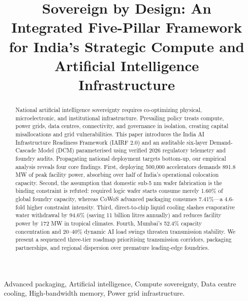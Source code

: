\documentclass[conference]{IEEEtran}
\begin{document}
\title{Sovereign by Design: An Integrated Five-Pillar Framework\\for India's Strategic Compute and Artificial Intelligence Infrastructure}

\author{
}

\maketitle
\thispagestyle{empty}

\begin{abstract}
National artificial intelligence sovereignty requires co-optimizing physical, microelectronic, and institutional infrastructure. Prevailing policy treats compute, power grids, data centres, connectivity, and governance in isolation, creating capital misallocations and grid vulnerabilities. This paper introduces the India AI Infrastructure Readiness Framework (IAIRF 2.0) and an auditable six-layer Demand-Cascade Model (DCM) parameterised using verified 2026 regulatory telemetry and foundry audits. Propagating national deployment targets bottom-up, our empirical analysis reveals four core findings. First, deploying 500{,}000 accelerators demands 891.8 MW of peak facility power, absorbing over half of India's operational colocation capacity. Second, the assumption that domestic sub-5 nm wafer fabrication is the binding constraint is refuted: required logic wafer starts consume merely 1.60\% of global foundry capacity, whereas CoWoS advanced packaging consumes 7.41\%---a 4.6-fold higher constraint intensity. Third, direct-to-chip liquid cooling slashes evaporative water withdrawal by 94.6\% (saving 11 billion litres annually) and reduces facility power by 172 MW in tropical climates. Fourth, Mumbai's 52.4\% capacity concentration and 20--40\% dynamic AI load swings threaten transmission stability. We present a sequenced three-tier roadmap prioritising transmission corridors, packaging partnerships, and regional dispersion over premature leading-edge foundries.
\end{abstract}

\begin{IEEEkeywords}
Advanced packaging, Artificial intelligence, Compute sovereignty, Data centre cooling, High-bandwidth memory, Power grid infrastructure.
\end{IEEEkeywords}
\end{document}
